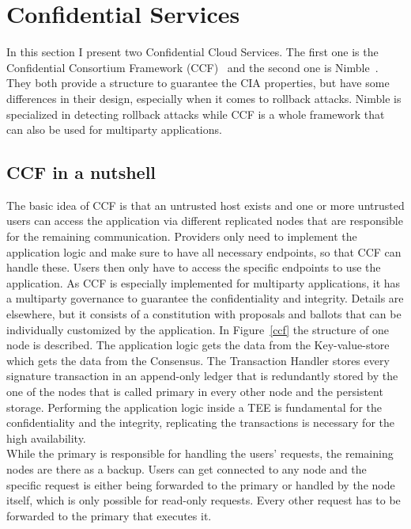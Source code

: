 \section{Confidential Services}
In this section I present two Confidential Cloud Services. The first one is the Confidential Consortium Framework (CCF)~\cite{Howard} and the second one is Nimble~\cite{Nimble}. They both provide a structure to guarantee the CIA properties, but have some differences in their design, especially when it comes to rollback attacks. Nimble is specialized in detecting rollback attacks while CCF is a whole framework that can also be used for multiparty applications.
\subsection{CCF in a nutshell}
The basic idea of CCF is that an untrusted host exists and one or more untrusted users can access the application via different replicated nodes that are responsible for the remaining communication. Providers only need to implement the application logic and make sure to have all necessary endpoints, so that CCF can handle these. Users then only have to access the specific endpoints to use the application. As CCF is especially implemented for multiparty applications, it has a multiparty governance to guarantee the confidentiality and integrity. Details are elsewhere, but it consists of a constitution with proposals and ballots that can be individually customized by the application. In Figure~\ref{ccf} the structure of one node is described. The application logic gets the data from the Key-value-store which gets the data from the Consensus. %
  The Transaction Handler stores every signature transaction in an append-only ledger that is redundantly stored by the one of the nodes that is called primary in every other node and the persistent storage. Performing the application logic inside a TEE is fundamental for the confidentiality and the integrity, replicating the transactions is necessary for the high availability.\\ %
While the primary is responsible for handling the users' requests, the remaining nodes are there as a backup. Users can get connected to any node and the specific request is either being forwarded to the primary or handled by the node itself, which is only possible for read-only requests. Every other request has to be forwarded to the primary that executes it.\\
